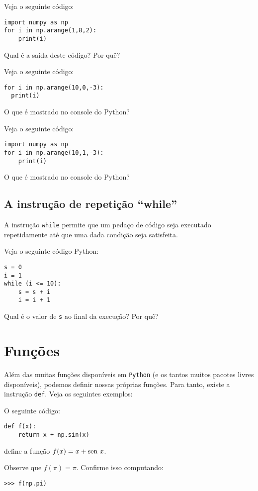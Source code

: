 \begin{ex}
  Veja o seguinte código:
\begin{verbatim}
import numpy as np
for i in np.arange(1,8,2):
    print(i)
\end{verbatim}
Qual é a saída deste código? Por quê?
\end{ex}

\begin{ex}
  Veja o seguinte código:
\begin{verbatim}
for i in np.arange(10,0,-3):
  print(i)
\end{verbatim}
O que é mostrado no console do Python?
\end{ex}

\begin{ex}
  Veja o seguinte código:
\begin{verbatim}
import numpy as np
for i in np.arange(10,1,-3):
    print(i)
\end{verbatim}
O que é mostrado no console do Python?
\end{ex}

\subsection{A instrução de repetição ``while''}

A instrução \verb+while+ permite que um pedaço de código seja executado repetidamente até que uma dada condição seja satisfeita.

\begin{ex}
Veja o seguinte código Python:
\begin{verbatim}
s = 0
i = 1
while (i <= 10):
    s = s + i
    i = i + 1
\end{verbatim}
Qual é o valor de \verb+s+ ao final da execução? Por quê?
\end{ex}

\section{Funções}

Além das muitas funções disponíveis em \verb+Python+ (e os tantos muitos pacotes livres disponíveis), podemos definir nossas próprias funções. Para tanto, existe a instrução \verb+def+. Veja os seguintes exemplos:

\begin{ex}
  O seguinte código:
\begin{verbatim}
def f(x):
    return x + np.sin(x)
\end{verbatim}
define a função $f(x) = x + \operatorname{sen}\, x$.

Observe que $f(\pi) = \pi$. Confirme isso computando:
\begin{verbatim}
>>> f(np.pi)
\end{verbatim}
\end{ex}

